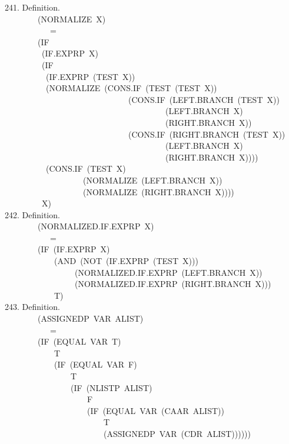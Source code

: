 \documentclass[10pt]{book}
\newenvironment{pubasis}{\begin{flushleft}}{\end{flushleft}}
\begin{document}
\begin{pubasis}
241.    Definition.\\
~~~~~~~~(NORMALIZE~X)\\
~~~~~~~~~~~=\\
~~~~~~~~(IF\\
~~~~~~~~~(IF.EXPRP~X)\\
~~~~~~~~~(IF\\
~~~~~~~~~~(IF.EXPRP~(TEST~X))\\
~~~~~~~~~~(NORMALIZE~(CONS.IF~(TEST~(TEST~X))\\
~~~~~~~~~~~~~~~~~~~~~~~~~~~~~~(CONS.IF~(LEFT.BRANCH~(TEST~X))\\
~~~~~~~~~~~~~~~~~~~~~~~~~~~~~~~~~~~~~~~(LEFT.BRANCH~X)\\
~~~~~~~~~~~~~~~~~~~~~~~~~~~~~~~~~~~~~~~(RIGHT.BRANCH~X))\\
~~~~~~~~~~~~~~~~~~~~~~~~~~~~~~(CONS.IF~(RIGHT.BRANCH~(TEST~X))\\
~~~~~~~~~~~~~~~~~~~~~~~~~~~~~~~~~~~~~~~(LEFT.BRANCH~X)\\
~~~~~~~~~~~~~~~~~~~~~~~~~~~~~~~~~~~~~~~(RIGHT.BRANCH~X))))\\
~~~~~~~~~~(CONS.IF~(TEST~X)\\
~~~~~~~~~~~~~~~~~~~(NORMALIZE~(LEFT.BRANCH~X))\\
~~~~~~~~~~~~~~~~~~~(NORMALIZE~(RIGHT.BRANCH~X))))\\
~~~~~~~~~X)\\

242.    Definition.\\
~~~~~~~~(NORMALIZED.IF.EXPRP~X)\\
~~~~~~~~~~~=\\
~~~~~~~~(IF~(IF.EXPRP~X)\\
~~~~~~~~~~~~(AND~(NOT~(IF.EXPRP~(TEST~X)))\\
~~~~~~~~~~~~~~~~~(NORMALIZED.IF.EXPRP~(LEFT.BRANCH~X))\\
~~~~~~~~~~~~~~~~~(NORMALIZED.IF.EXPRP~(RIGHT.BRANCH~X)))\\
~~~~~~~~~~~~T)\\

243.    Definition.\\
~~~~~~~~(ASSIGNEDP~VAR~ALIST)\\
~~~~~~~~~~~=\\
~~~~~~~~(IF~(EQUAL~VAR~T)\\
~~~~~~~~~~~~T\\
~~~~~~~~~~~~(IF~(EQUAL~VAR~F)\\
~~~~~~~~~~~~~~~~T\\
~~~~~~~~~~~~~~~~(IF~(NLISTP~ALIST)\\
~~~~~~~~~~~~~~~~~~~~F\\
~~~~~~~~~~~~~~~~~~~~(IF~(EQUAL~VAR~(CAAR~ALIST))\\
~~~~~~~~~~~~~~~~~~~~~~~~T\\
~~~~~~~~~~~~~~~~~~~~~~~~(ASSIGNEDP~VAR~(CDR~ALIST))))))\\


\end{pubasis}
\end{document}
